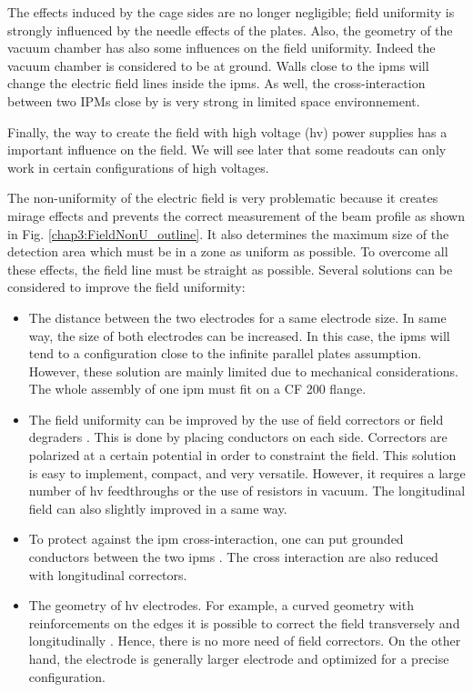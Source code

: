 \begin{refsection}
	The effects induced by the cage sides are no longer negligible; field uniformity is strongly influenced by the needle effects of the plates.
	Also, the geometry of the vacuum chamber has also some influences on the field uniformity. Indeed the vacuum chamber is considered to be at ground. Walls close to the \acrshort{ipm}s will change the electric field lines inside the \acrshort{ipm}s. As well, the cross-interaction between two IPMs close by is very strong in limited space environnement.

	Finally, the way to create the field with high voltage (\acrshort{hv}) power supplies has a important influence on the field. We will see later that some readouts can only work in certain configurations of high voltages.

	The non-uniformity of the electric field is very problematic because it creates mirage effects and prevents the correct measurement of the beam profile as shown in Fig. \ref{chap3:FieldNonU_outline}. It also determines the maximum size of the detection area which must be in a zone as uniform as possible. To overcome all these effects, the field line must be straight as possible. Several solutions can be considered to improve the field uniformity:
	\begin{itemize}
		\item The distance between the two electrodes for a same electrode size. In same way, the size of both electrodes can be increased. In this case, the \acrshort{ipm}s will tend to a configuration close to the infinite parallel plates assumption. However, these solution are mainly limited due to mechanical considerations. The whole assembly of one \acrshort{ipm} must fit on a CF 200 flange.
		\item The field uniformity can be improved by the use of field correctors or field degraders \cite[p. 103]{egber2012}. This is done by placing conductors on each side. Correctors are polarized at a certain potential in order to constraint the field. This solution is easy to implement, compact, and very versatile. However, it requires a large number of \acrshort{hv} feedthroughs or the use of resistors in vacuum. The longitudinal field can also slightly improved in a same way.
		\item To protect against the \acrshort{ipm} cross-interaction, one can put grounded conductors between the two \acrshort{ipm}s \cite[p. 132]{egber2012}. The cross interaction are also reduced with longitudinal correctors.
		\item The geometry of \acrshort{hv} electrodes. For example, a curved geometry with reinforcements on the edges it is possible to correct the field transversely and longitudinally \cite{Bartkoski2014}. Hence, there is no more need of field correctors. On the other hand, the electrode is generally larger electrode and optimized for a precise configuration.

\end{itemize}
\end{refsection}
